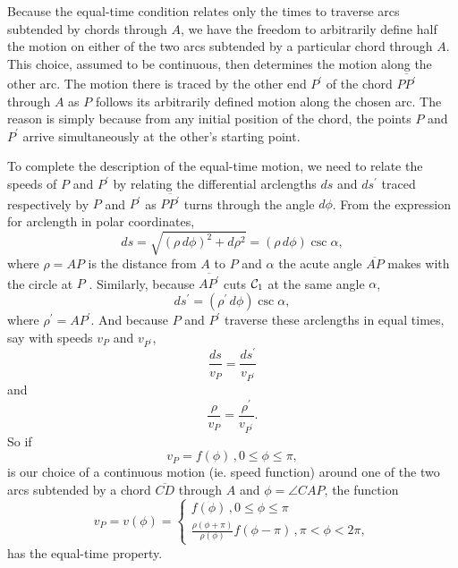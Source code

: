 \documentclass{ximera}
\begin{document}
Because the equal-time condition relates only the times to traverse arcs subtended by chords through $A$, we have the freedom to arbitrarily define half the motion on either of the two arcs subtended by a particular chord through $A$. This choice, assumed to be continuous, then determines the motion along the other arc. The motion there is traced by the other end $P^\prime$ of the chord $\overline{PP^\prime}$ through $A$ as $P$ follows its arbitrarily defined motion along the chosen arc. The reason is simply because from any initial position of the chord, the points $P$ and $P^\prime$ arrive simultaneously at the other's starting point.




To complete the description of the equal-time motion, we need to relate the speeds of $P$ and $P^\prime$ by relating the differential arclengths $ds$ and $ds^\prime$ traced respectively by $P$ and $P^\prime$ as $\overline{PP^\prime}$ turns through the angle $d\phi$. From the expression for arclength in polar coordinates,  
\begin{equation}
   ds =  \sqrt{(\rho \, d\phi)^2 + d\rho^2}   =   (\rho \, d\phi) \csc \alpha ,   \label{Eq:ArcLength}
\end{equation}
where $\rho = AP$ is the distance from $A$ to $P$ and $\alpha$ the acute angle $\overline{AP}$ makes with the circle at $P$ . Similarly, because $\overline{AP^\prime}$ cuts ${\cal C}_1$ at the same angle $\alpha$,
\begin{equation}
   ds^\prime =   (\rho^\prime \, d\phi) \csc \alpha ,  \label{Eq:ArcLength2}
\end{equation}
where $\rho^\prime = AP^\prime$. And because $P$ and $P^\prime$ traverse these arclengths in equal times, say with speeds $v_P$ and $v_{P^\prime}$, 
\[
   \frac{ds}{v_P} = \frac{ds^\prime}{v_{P^\prime}}
\] 
and
\[
    \frac{\rho}{v_P} = \frac{\rho^\prime}{v_{P^\prime}} .
\]
So if 
\[
  v_P = f(\phi) \, , 0\leq \phi \leq \pi , 
\]
is our choice of a continuous motion (ie. speed function) around one of the two arcs subtended by a chord $\overline{CD}$ through $A$ and $\phi = \angle CAP$, the function
\[
   v_P = v(\phi)  = 
\begin{cases}
          f(\phi) \, , 0\leq \phi \leq \pi \\
         \frac{\rho (\phi + \pi)}{\rho (\phi)} f(\phi-\pi) \, , \pi < \phi < 2\pi ,
\end{cases}
\]
has the equal-time property. %
\end{document}
